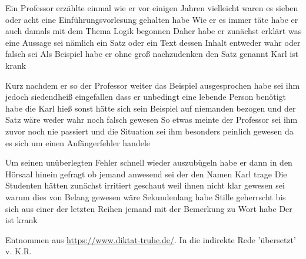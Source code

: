 \documentclass[
  DIV=calc,
  BCOR=5mm,
  11pt,
  headings=small,
  oneside,
  abstract=true,
  toc=bib,
  english,ngerman]{scrbook}
\begin{document}
\nocite{*}


{\Large \wesu 

Ein Professor erzählte einmal wie er vor einigen Jahren vielleicht waren es sieben oder acht eine Einführungsvorlesung gehalten habe Wie er es immer täte habe er auch damals mit dem Thema Logik begonnen Daher habe er zunächst erklärt was eine Aussage sei nämlich ein Satz oder ein Text dessen Inhalt entweder wahr oder falsch sei Als Beispiel habe er ohne gro{\ss} nachzudenken den Satz genannt Karl ist krank 

Kurz nachdem er so der Professor weiter das Beispiel ausgesprochen habe sei ihm jedoch siedendhei{\ss} eingefallen dass er unbedingt eine lebende Person benötigt habe die Karl hie{\ss} sonst hätte sich sein Beispiel auf niemanden bezogen und der Satz wäre weder wahr noch falsch gewesen So etwas meinte der Professor sei ihm zuvor noch nie passiert und die Situation sei ihm besonders peinlich gewesen da es sich um einen Anfängerfehler handele 

Um seinen unüberlegten Fehler schnell wieder auszubügeln habe er dann in den Hörsaal hinein gefragt ob jemand anwesend sei der den Namen Karl trage Die Studenten hätten zunächst irritiert geschaut weil ihnen nicht klar gewesen sei warum dies von Belang gewesen wäre Sekundenlang habe Stille geherrscht bis sich aus einer der letzten Reihen jemand mit der Bemerkung zu Wort habe Der ist krank

}

\vspace{0.5cm}

\footnotesize{
Entnommen aus \href{https://www.diktat-truhe.de/}{https://www.diktat-truhe.de/}. In die indirekte Rede 'übersetzt' v. K.R.
}
\end{document}
